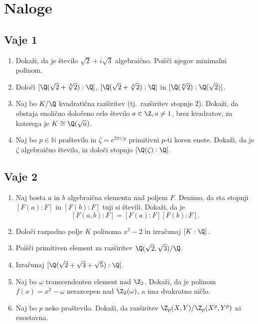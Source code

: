 \appendix
\section{Naloge}
\subsection*{Vaje 1}

\begin{enumerate}
    \item Dokaži, da je število $\sqrt{2} + i\sqrt{3}$ algebraično. Poišči njegov minimalni polinom.

    \item Določi $[\Q(\sqrt{2} + \sqrt[3]{2}) : \Q]$, $[\Q(\sqrt{2} + 
    \sqrt[4]{2}) : \Q]$ in $[\Q(\sqrt[6]{2}) : \Q(\sqrt{2})]$.

    \item Naj bo $K/\Q$ kvadratična razširitev (tj.~razširitev stopnje $2$). 
    Dokaži, da obstaja enolično določeno celo število $a \in \Z, a \neq 1$, 
    brez kvadratov, za katerega je $K \cong \Q(\sqrt{a})$.

    \item Naj bo $p \in \mathbb{N}$ praštevilo in $\zeta = e^{2\pi i/p}$ primitivni $p$-ti koren enote. 
    Dokaži, da je $\zeta$ algebraično število, in določi stopnjo $[\Q(\zeta) : \Q]$.
\end{enumerate}

\subsection*{Vaje 2}

\begin{enumerate}
    \item Naj bosta $a$ in $b$ algebraična elementa nad poljem $F$. 
    Denimo, da sta stopnji $[F(a) : F]$ in $[F(b) : F]$ tuji si števili. Dokaži, da je
    \[
    [F(a, b) : F] = [F(a) : F][F(b) : F].
    \]
    \item Določi razpadno polje $K$ polinoma $x^5 - 2$ in izračunaj $[K : \Q]$.
    \item Poišči primitiven element za razširitev $\Q(\sqrt{2}, \sqrt{3})/\Q$.
    \item Izračunaj $[\Q(\sqrt{2} + \sqrt{3} + \sqrt{5}) : \Q]$.
    \item Naj bo $\omega$ transcendenten element nad $\Z_2$. 
    Dokaži, da je polinom $f(x) = x^2 - \omega$ nerazcepen nad $\Z_2(\omega)$, a ima dvakratno ničlo.
    \item Naj bo $p$ neko praštevilo. Dokaži, da razširitev $\Z_p(X, Y)/\Z_p(X^p, Y^p)$ ni enostavna.
\end{enumerate}


